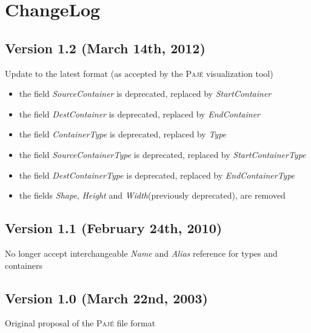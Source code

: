 \documentclass[12pt]{article}
\newcommand{\Paje}{\textsc{Paj\'e}\xspace}
\newcommand{\PajeField}[1]{\emph{#1}\xspace}
\newcommand{\Name}{\PajeField{Name}}
\newcommand{\Type}{\PajeField{Type}}
\newcommand{\StartContainerType}{\PajeField{StartContainerType}}
\newcommand{\EndContainerType}{\PajeField{EndContainerType}}
\newcommand{\Alias}{\PajeField{Alias}}
\newcommand{\EndContainer}{\PajeField{EndContainer}}
\newcommand{\StartContainer}{\PajeField{StartContainer}}
\newcommand{\Shape}{\PajeField{Shape}}
\newcommand{\Height}{\PajeField{Height}}
\newcommand{\Width}{\PajeField{Width}}
\newcommand{\SourceContainer}{\PajeField{SourceContainer}}
\newcommand{\DestContainer}{\PajeField{DestContainer}}
\newcommand{\ContainerType}{\PajeField{ContainerType}}
\newcommand{\SourceContainerType}{\PajeField{SourceContainerType}}
\newcommand{\DestContainerType}{\PajeField{DestContainerType}}
\newenvironment{itemize*}%
               {\vspace{-1em}
                 \begin{itemize}%
                   \setlength{\itemsep}{0pt}%
                   \setlength{\parskip}{0pt}}%
               {\end{itemize}}
\begin{document}
\section{ChangeLog}
\label{ChangeLog}

\subsection*{Version 1.2 (March 14th, 2012)}
\begin{itemize*}
\item Update to the latest format (as accepted by the \Paje
  visualization tool)
  \begin{itemize}
    \item the field \SourceContainer is deprecated, replaced by \StartContainer
    \item the field \DestContainer is deprecated, replaced by \EndContainer
    \item the field \ContainerType is deprecated, replaced by \Type
    \item the field \SourceContainerType is deprecated, replaced by \StartContainerType
    \item the field \DestContainerType is deprecated, replaced by \EndContainerType
    \item the fields \Shape, \Height and \Width (previously deprecated), are removed
  \end{itemize}
\end{itemize*}


\subsection*{Version 1.1 (February 24th, 2010)}
\begin{itemize*}
\item No longer accept interchangeable \Name and \Alias reference for types and containers
\end{itemize*}

\subsection*{Version 1.0 (March 22nd, 2003)}
\begin{itemize*}
\item Original proposal of the \Paje file format
\end{itemize*}

\end{document}

